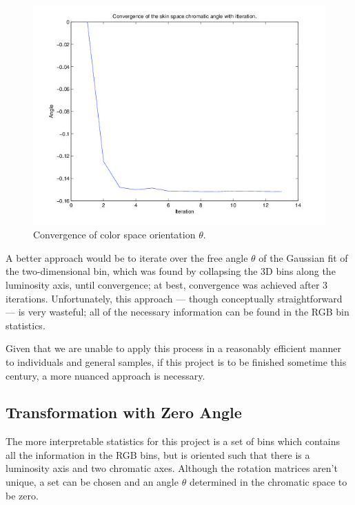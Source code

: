\begin{figure}[h!]
  \centering
    \includegraphics[width=\textwidth]{Chapter3/Figs/ConvergenceOfSkinSpaceFinal.jpg}
    \caption{Convergence of color space orientation $\theta$.}  \label{fig:ConvergenceTheta}
\end{figure}

A better approach would be to iterate over the free angle $\theta$ of the Gaussian fit of the two-dimensional bin, which was found by collapsing the 3D bins along the luminosity axis, until convergence; at best, convergence was achieved after 3 iterations. Unfortunately, this approach --- though conceptually straightforward --- is very wasteful; all of the necessary information can be found in the RGB bin statistics.

Given that we are unable to apply this process in a reasonably efficient manner to individuals and general samples, if this project is to be finished sometime this century, a more nuanced approach is necessary.

\subsection{Transformation with Zero Angle}\label{sec:TransWithZeroAngle}

The more interpretable statistics for this project is a set of bins which contains all the information in the RGB bins, but is oriented such that there is a luminosity axis and two chromatic axes. Although the rotation matrices aren't unique, a set can be chosen and an angle $\theta$ determined in the chromatic space to be zero.

